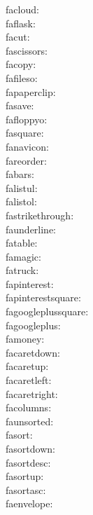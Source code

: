 facloud: {\FA \facloud} \\
faflask: {\FA \faflask} \\
facut: {\FA \facut} \\
fascissors: {\FA \fascissors} \\
facopy: {\FA \facopy} \\
fafileso: {\FA \fafileso} \\
fapaperclip: {\FA \fapaperclip} \\
fasave: {\FA \fasave} \\
fafloppyo: {\FA \fafloppyo} \\
fasquare: {\FA \fasquare} \\
fanavicon: {\FA \fanavicon} \\
fareorder: {\FA \fareorder} \\
fabars: {\FA \fabars} \\
falistul: {\FA \falistul} \\
falistol: {\FA \falistol} \\
fastrikethrough: {\FA \fastrikethrough} \\
faunderline: {\FA \faunderline} \\
fatable: {\FA \fatable} \\
famagic: {\FA \famagic} \\
fatruck: {\FA \fatruck} \\
fapinterest: {\FA \fapinterest} \\
fapinterestsquare: {\FA \fapinterestsquare} \\
fagoogleplussquare: {\FA \fagoogleplussquare} \\
fagoogleplus: {\FA \fagoogleplus} \\
famoney: {\FA \famoney} \\
facaretdown: {\FA \facaretdown} \\
facaretup: {\FA \facaretup} \\
facaretleft: {\FA \facaretleft} \\
facaretright: {\FA \facaretright} \\
facolumns: {\FA \facolumns} \\
faunsorted: {\FA \faunsorted} \\
fasort: {\FA \fasort} \\
fasortdown: {\FA \fasortdown} \\
fasortdesc: {\FA \fasortdesc} \\
fasortup: {\FA \fasortup} \\
fasortasc: {\FA \fasortasc} \\
faenvelope: {\FA \faenvelope} \\
